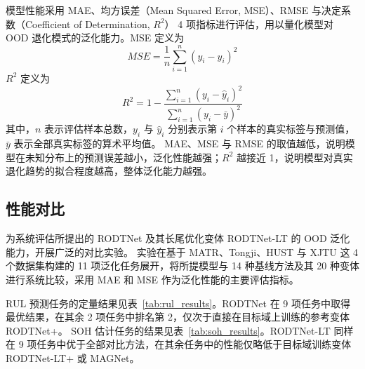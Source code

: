 模型性能采用 MAE、均方误差（Mean Squared Error, MSE）、RMSE 与决定系数（Coefficient of Determination, $R^2$） 4 项指标进行评估，用以量化模型对 OOD 退化模式的泛化能力。MSE 定义为
% 
\begin{equation}
MSE = \frac{1}{n} \sum_{i=1}^{n} \left( y_i - \hat{y}_i \right)^2
\end{equation}
% 
$R^2$ 定义为
% 
\begin{equation}
R^2 = 1 - \frac{\sum_{i=1}^{n} \left( y_i - \hat{y}_i \right)^2}{\sum_{i=1}^{n} \left( y_i - \bar{y} \right)^2}
\end{equation}
其中，$n$ 表示评估样本总数，$y_i$ 与 $\hat{y}_i$ 分别表示第 $i$ 个样本的真实标签与预测值，$\bar{y}$ 表示全部真实标签的算术平均值。
% 
MAE、MSE 与 RMSE 的取值越低，说明模型在未知分布上的预测误差越小，泛化性能越强；$R^2$ 越接近 1，说明模型对真实退化趋势的拟合程度越高，整体泛化能力越强。

\subsection{性能对比}\label{subsec:RODTNet_comparison_experiment}

为系统评估所提出的 RODTNet 及其长尾优化变体 RODTNet-LT 的 OOD 泛化能力，开展广泛的对比实验。
实验在基于 MATR、Tongji、HUST 与 XJTU 这 4 个数据集构建的 11 项泛化任务展开，将所提模型与 14 种基线方法及其 20 种变体进行系统比较，采用 MAE 和 MSE 作为泛化性能的主要评估指标。

RUL 预测任务的定量结果见表~\ref{tab:rul_results}。RODTNet 在 9 项任务中取得最优结果，在其余 2 项任务中排名第 2，仅次于直接在目标域上训练的参考变体 RODTNet+。
SOH 估计任务的结果见表~\ref{tab:soh_results}。RODTNet-LT 同样在 9 项任务中优于全部对比方法，在其余任务中的性能仅略低于目标域训练变体 RODTNet-LT+ 或 MAGNet。

